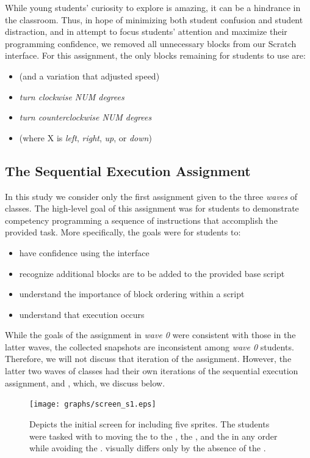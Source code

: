 While young students' curiosity to explore is amazing, it can be a hindrance in
the classroom. Thus, in hope of minimizing both student confusion and student
distraction, and in attempt to focus students' attention and maximize their
programming confidence, we removed all unnecessary blocks from our Scratch
interface. For this assignment, the only blocks remaining for students to use
are:

\begin{itemize}
\item \glideDIST{} (and a variation that adjusted speed)
\item \emph{turn clockwise NUM degrees}
\item \emph{turn counterclockwise NUM degrees}
\item \pointDIR{} (where X is \emph{left}, \emph{right}, \emph{up}, or
  \emph{down})
\end{itemize}

\subsection{The Sequential Execution Assignment}

In this study we consider only the first assignment given to the three
\emph{waves} of classes. The high-level goal of this assignment was for
students to demonstrate competency programming a sequence of instructions that
accomplish the provided task. More specifically, the goals were for students
to:

\begin{itemize}
\item have confidence using the interface
\item recognize additional blocks are to be added to the provided base script
\item understand the importance of block ordering within a script
\item understand that execution occurs \netclicked{}
\end{itemize}

While the goals of the assignment in \emph{wave 0} were consistent with those
in the latter waves, the collected snapshots are inconsistent among \emph{wave
  0} students. Therefore, we will not discuss that iteration of the
assignment. However, the latter two waves of classes had their own iterations
of the sequential execution assignment, \sone{} and \stwo{}, which, we discuss
below.

\begin{figure}[!t]
\centering
\texttt{[image: graphs/screen\_s1.eps]}
\caption{Depicts the initial screen for \sone{} including five sprites. The
  students were tasked with to moving the \net{} to \catch{} the \bear{}, the
  \horse{}, and the \zebra{} in any order while avoiding the \snake{}. \stwo{}
  visually differs only by the absence of the \snake{}.}
\end{figure}

